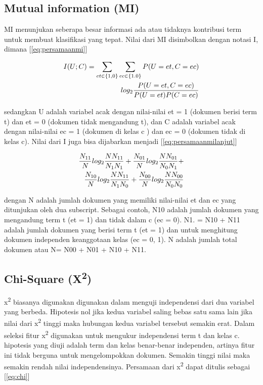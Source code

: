 \subsection*{Mutual information (MI)}

MI menunjukan seberapa besar informasi ada atau tidaknya kontribusi term untuk membuat klasifikasi yang tepat. Nilai dari MI disimbolkan dengan notasi I, dimana [\ref{eq:persamaanmi}]

\begin{equation}
\begin{split}
\tiny
I(U;C) = \sum\limits_{et\in\{1,0\}}\sum\limits_{ec\in\{1.0\}} P(U = et, C = ec) \\
log_2 \frac{P(U = et,C =ec)}{P(U = et)P(C = ec)} 
\label{eq:persamaanmi}
\normalsize
\end{split}
\end{equation}

sedangkan U adalah variabel acak dengan nilai-nilai et = 1 (dokumen berisi term t) dan et = 0 (dokumen tidak mengandung t), dan C adalah variabel acak dengan nilai-nilai ec = 1 (dokumen di kelas c ) dan ec = 0 (dokumen tidak di kelas c). Nilai dari I juga bisa dijabarkan menjadi [\ref{eq:persamaanmilanjut}]

\begin{equation}
\begin{split}
\tiny
\frac{N_{11}}{N}log_2\frac{NN_{11}}{N_1N_1} + \frac{N_{01}}{N}log_2\frac{NN_{01}}{N_0N_1} + \\
\frac{N_{10}}{N}log_2\frac{NN_{11}}{N_1N_0} + \frac{N_{00}}{N}log_2\frac{NN_{00}}{N_0N_0}
\label{eq:persamaanmilanjut}
\normalsize
\end{split}
\end{equation}


dengan N adalah jumlah dokumen yang memiliki nilai-nilai et dan ec yang ditunjukan oleh dua subscript. Sebagai contoh, N10 adalah jumlah dokumen yang mengandung term t (et = 1) dan tidak dalam c (ec = 0). N1. = N10 + N11 adalah jumlah dokumen yang berisi term t (et = 1) dan untuk menghitung dokumen independen keanggotaan kelas (ec = {0, 1}). N adalah jumlah total dokumen atau N= N00 + N01 + N10 + N11.

\subsection*{Chi-Square (X\textsuperscript{2})}
x\textsuperscript{2} biasanya digunakan digunakan dalam menguji independensi dari dua variabel  yang berbeda. Hipotesis nol jika kedua variabel saling bebas satu sama lain jika nilai dari x\textsuperscript{2} tinggi maka hubungan kedua variabel tersebut semakin erat. Dalam seleksi fitur x\textsuperscript{2} digunakan untuk mengukur independensi term t dan kelas c. hipotesis yang diuji adalah term dan kelas benar-benar independen, artinya fitur ini tidak berguna untuk mengelompokkan dokumen. Semakin tinggi nilai maka semakin rendah nilai independensinya. Persamaan dari x\textsuperscript{2}  dapat ditulis sebagai [\ref{eq:chi}]

